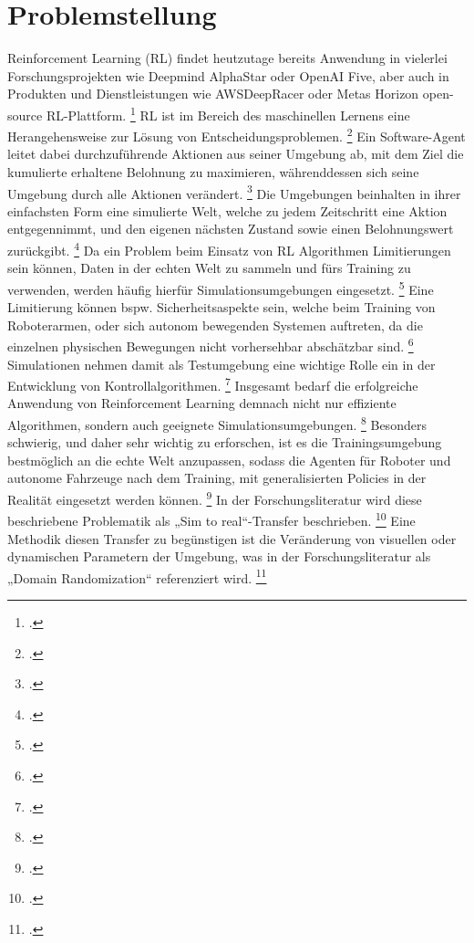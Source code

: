 \section{Problemstellung}

Reinforcement Learning (RL) findet heutzutage bereits Anwendung in vielerlei Forschungsprojekten wie Deepmind AlphaStar oder OpenAI Five, aber auch in Produkten und Dienstleistungen wie AWSDeepRacer oder Metas Horizon open-source RL-Plattform. \footcite[Vgl.][S. 4]{Yuxi.2019}
RL ist im Bereich des maschinellen Lernens eine Herangehensweise zur Lösung von Entscheidungsproblemen. \footcite[Vgl.][S. 3]{Schuderer.2021}
Ein Software-Agent leitet dabei durchzuführende Aktionen aus seiner Umgebung ab, mit dem Ziel die kumulierte erhaltene Belohnung zu maximieren, währenddessen sich seine Umgebung durch alle Aktionen verändert. \footcite[Vgl.][S. 3]{Schuderer.2021}
Die Umgebungen beinhalten in ihrer einfachsten Form eine simulierte Welt, welche zu jedem Zeitschritt eine Aktion entgegennimmt, und den eigenen nächsten Zustand sowie einen Belohnungswert zurückgibt. \footcite[Vgl.][S. 1]{Reda.2020}
Da ein Problem beim Einsatz von RL Algorithmen Limitierungen sein können, Daten in der echten Welt zu sammeln und fürs Training zu verwenden, werden häufig hierfür Simulationsumgebungen eingesetzt. \footcite[Vgl.][S. 737]{Zhao.2020}
Eine Limitierung können bspw. Sicherheitsaspekte sein, welche beim Training von Roboterarmen, oder sich autonom bewegenden Systemen auftreten, da die einzelnen physischen Bewegungen nicht vorhersehbar abschätzbar sind. \footcite[Vgl.][S. 738]{Zhao.2020}
Simulationen nehmen damit als Testumgebung eine wichtige Rolle ein in der Entwicklung von Kontrollalgorithmen. \footcite[Vgl.][S. 2]{Cutler.2014}
Insgesamt bedarf die erfolgreiche Anwendung von Reinforcement Learning demnach nicht nur effiziente Algorithmen, sondern auch geeignete Simulationsumgebungen. \footcite[Vgl.][S. 8]{Reda.2020}
Besonders schwierig, und daher sehr wichtig zu erforschen, ist es die Trainingsumgebung bestmöglich an die echte Welt anzupassen, sodass die Agenten für Roboter und autonome Fahrzeuge nach dem Training, mit generalisierten Policies in der Realität eingesetzt werden können. \footcite[Vgl.][S. 1]{DBLP:journals/corr/abs-1910-10537}
In der Forschungsliteratur wird diese beschriebene Problematik als „Sim to real“-Transfer beschrieben. \footcite[Vgl.][S. 738]{Zhao.2020}
Eine Methodik diesen Transfer zu begünstigen ist die Veränderung von visuellen oder dynamischen Parametern der Umgebung, was in der Forschungsliteratur als „Domain Randomization“ referenziert wird. \footcite[Vgl.][S. 2]{DBLP:journals/corr/abs-1910-10537}
